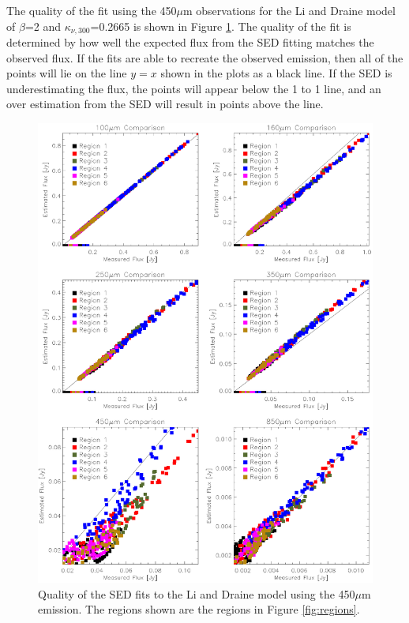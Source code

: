 The quality of the fit using the 450$\mu$m observations for the Li and Draine model of $\beta$=2 and $\kappa_{\nu,300}$=0.2665 is shown in Figure \ref{fig:w2_4}.  The quality of the fit is determined by how well the expected flux from the SED fitting matches the observed flux.  If the fits are able to recreate the observed emission, then all of the points will lie on the line $y=x$ shown in the plots as a black line.  If the SED is underestimating the flux, the points will appear below the 1 to 1 line, and an over estimation from the SED will result in points above the line.  

\begin{figure}
  \centering
  \includegraphics[width=1.\textwidth]{sed_imgs/flux_compare_2_4.eps}
  \caption[Li and Draine Model SED Fit Quality Using 450$\mu$m Data]{Quality of the SED fits to the Li and Draine model using the 450$\mu$m emission.  The regions shown are the regions in Figure \ref{fig:regions}.}
  \label{fig:w2_4}
\end{figure}

